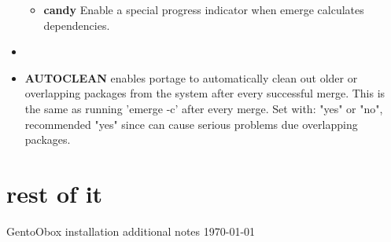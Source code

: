 \documentclass[10pt,a4paper]{article}
\begin{document}
\begin{itemize}
\begin{itemize}[label={o}]
                    \item \textbf{candy} Enable a special progress indicator when emerge calculates dependencies.
                    
                \end{itemize}
            
                \item \item \textbf{AUTOCLEAN} enables portage to automatically clean out older or overlapping packages from the system after every successful merge. This is the same as running 'emerge -c' after every merge. Set with: "yes" or "no", recommended "yes" since can cause serious problems due overlapping packages.
            \end{itemize}

    
    \newpage
    \section{rest of it}
    
	\begin{center} GentoObox installation additional notes \today \end{center}
\end{document}
